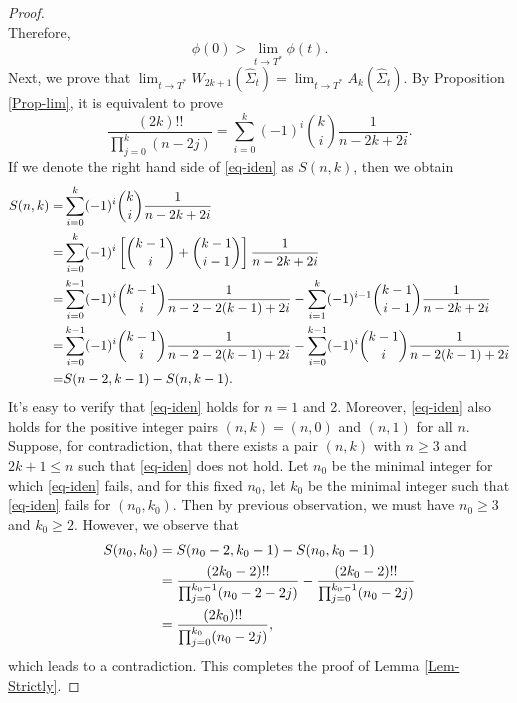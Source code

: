 \documentclass[11pt,reqno]{amsart}
\theoremstyle{definition}
\theoremstyle{remark}
\numberwithin{equation}{section}
\renewcommand{\(}{\left(}
\renewcommand{\)}{\right)}
\renewcommand{\-}{\overline}
\begin{document}
\begin{proof}
\begin{equation*}
\end{equation*}
Therefore,
\begin{equation}
	\phi(0)>\lim_{t\to T^{*}}\phi(t).
\end{equation}
Next, we prove that $\lim_{t\to T^{*}}W_{2k+1}(\widehat{\Sigma}_{t})=\lim_{t\to T^*}A_k(\widehat{\Sigma}_t)$. By Proposition \ref{Prop-lim}, it is equivalent to prove
\begin{equation}\label{eq-iden}
	\frac{(2k)!!}{\prod_{j=0}^k(n-2j)}=\sum_{i=0}^k(-1)^i\binom{k}{i}\frac{1}{n-2k+2i}.
\end{equation}
If we denote the right hand side of \eqref{eq-iden} as $S(n,k)$, then we obtain
\begin{align}
	S(n,k)=&\sum_{i=0}^k (-1)^i\binom{k}{i}\frac{1}{n-2k+2i}\notag\\
	=&\sum_{i=0}^k (-1)^i\left[\binom{k-1}{i}+\binom{k-1}{i-1}\right]\frac{1}{n-2k+2i}\notag\\
	=&\sum_{i=0}^{k-1}(-1)^i\binom{k-1}{i}\frac{1}{n-2-2(k-1)+2i}-\sum_{i=1}^k(-1)^{i-1}\binom{k-1}{i-1}\frac{1}{n-2k+2i}\notag\\
	=&\sum_{i=0}^{k-1}(-1)^i\binom{k-1}{i}\frac{1}{n-2-2(k-1)+2i}-\sum_{i=0}^{k-1}(-1)^i\binom{k-1}{i}\frac{1}{n-2(k-1)+2i}\notag\\
	=&S(n-2,k-1)-S(n,k-1).\label{In-Snk}
\end{align}
It's easy to verify that \eqref{eq-iden} holds for $n=1$ and 2. Moreover, \eqref{eq-iden} also holds for the positive integer pairs $(n,k)=(n,0)$ and $(n,1)$ for all $n$. Suppose, for contradiction, that there exists a pair $(n,k)$ with $n\geq 3$ and $2k+1\leq n$ such that \eqref{eq-iden} does not hold. Let $n_0$ be the minimal integer for which \eqref{eq-iden} fails, and for this fixed $n_0$, let $k_0$ be the minimal integer such that \eqref{eq-iden} fails for $(n_0,k_0)$. Then by previous observation, we must have $n_0\geq 3$ and $k_0\geq 2$. However, we observe that
\begin{align}
	S(n_0,k_0)&=S(n_0-2,k_0-1)-S(n_0,k_0-1)\notag\\
	&=\frac{(2k_0-2)!!}{\prod_{j=0}^{k_0-1}(n_0-2-2j)}-\frac{(2k_0-2)!!}{\prod_{j=0}^{k_0-1}(n_0-2j)}\notag\\
	&=\frac{(2k_0)!!}{\prod_{j=0}^{k_0}(n_0-2j)},
\end{align}
which leads to a contradiction. This completes the proof of Lemma \ref{Lem-Strictly}.
\end{proof}
\end{document}
